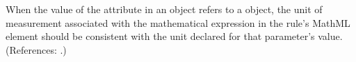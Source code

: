 When the value of the attribute  in an \AssignmentRule
object refers to a \Parameter object, the unit of measurement associated
with the mathematical expression in the rule's MathML  element
should be consistent with the unit declared for that parameter's value.
(References: .)
